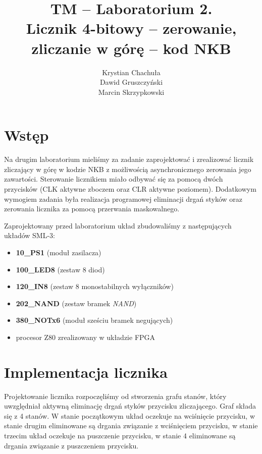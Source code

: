 \documentclass[fleqn]{article}
\title{TM -- Laboratorium 2. \\ \large Licznik 4-bitowy – zerowanie, zliczanie w górę – kod NKB}
\author{Krystian Chachuła \\ Dawid Gruszczyński \\ Marcin Skrzypkowski}
\begin{document}
\maketitle

\setcounter{page}{0}
\thispagestyle{empty}

\pagebreak

\setcounter{page}{1}

\section{Wstęp}

Na drugim laboratorium mieliśmy za zadanie zaprojektować i zrealizować licznik zliczający w górę w kodzie NKB z możliwością asynchronicznego zerowania jego zawartości.
Sterowanie licznikiem miało odbywać się za pomocą dwóch przycisków (CLK aktywne zboczem oraz CLR aktywne poziomem).
Dodatkowym wymogiem zadania była realizacja programowej eliminacji drgań styków oraz zerowania licznika za pomocą przerwania maskowalnego.

Zaprojektowany przed laboratorium układ zbudowaliśmy z następujących układów SML-3:

\begin{itemize}
	\item \textbf{10\_PS1} (moduł zasilacza)
	\item \textbf{100\_LED8} (zestaw 8 diod)
	\item \textbf{120\_IN8} (zestaw 8 monostabilnych wyłączników)
	\item \textbf{202\_NAND} (zestaw bramek \textit{NAND})
	\item \textbf{380\_NOTx6} (moduł sześciu bramek negujących)
	\item procesor Z80 zrealizowany w układzie FPGA
\end{itemize}

\section{Implementacja licznika}

Projektowanie licznika rozpoczęliśmy od stworzenia grafu stanów, który uwzględniał aktywną eliminację drgań styków przycisku zliczającego.
Graf składa się z 4 stanów. W stanie początkowym układ oczekuje na wciśnięcie przycisku, w stanie drugim eliminowane są drgania związanie z wciśnięciem przycisku, w stanie trzecim układ oczekuje na puszczenie przycisku, w stanie 4 eliminowane są drgania związanie z puszczeniem przycisku.
\end{document}

